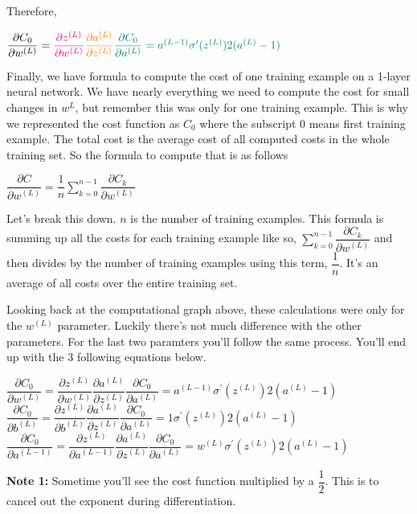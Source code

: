 \documentclass[11pt]{article}
\begin{document}
Therefore,

\(\dfrac{\partial C_0}{\partial w^{(L)}} = \color{magenta}{ \dfrac{\partial z^{(L)}}{\partial w^{(L)}} } \color{orange}{ \dfrac{\partial a^{(L)}}{\partial z^{(L)}} } \color{teal}{ \dfrac{\partial C_0}{\partial a^{(L)}} } = a^{(L-1)} \sigma^{\prime}(z^{(L)}) 2(a^{(L)} - 1)\)

Finally, we have formula to compute the cost of one training example on
a 1-layer neural network. We have nearly everything we need to compute
the cost for small changes in \(w^{L}\), but remember this was only for
one training example. This is why we represented the cost function as
\(C_0\) where the subscript 0 means first training example. The total
cost is the average cost of all computed costs in the whole training
set. So the formula to compute that is as follows

\(\dfrac{\partial C}{\partial w^{(L)}} = \dfrac{1}{n} \sum\limits_{k=0}^{n-1} \dfrac{\partial C_k}{\partial w^{(L)}}\)

Let's break this down. \(n\) is the number of training examples. This
formula is summing up all the costs for each training example like so,
\(\sum\limits_{k=0}^{n-1} \dfrac{\partial C_k}{\partial w^{(L)}}\) and
then divides by the number of training examples using this term,
\(\dfrac{1}{n}\). It's an average of all costs over the entire training
set.

Looking back at the computational graph above, these calculations were
only for the \(w^{(L)}\) parameter. Luckily there's not much difference
with the other parameters. For the last two paramters you'll follow the
same process. You'll end up with the 3 following equations below.

\(\dfrac{\partial C_0}{\partial w^{(L)}} = \dfrac{\partial z^{(L)}}{\partial w^{(L)}} \dfrac{\partial a^{(L)}}{\partial z^{(L)}} \dfrac{\partial C_0}{\partial a^{(L)}} = a^{(L-1)} \sigma^{\prime}(z^{(L)}) 2(a^{(L)} - 1)\)\\
\(\dfrac{\partial C_0}{\partial b^{(L)}} = \dfrac{\partial z^{(L)}}{\partial b^{(L)}} \dfrac{\partial a^{(L)}}{\partial z^{(L)}} \dfrac{\partial C_0}{\partial a^{(L)}} = 1 \sigma^{\prime}(z^{(L)}) 2(a^{(L)} - 1)\)\\
\(\dfrac{\partial C_0}{\partial a^{(L-1)}} = \dfrac{\partial z^{(L)}}{\partial a^{(L-1)}} \dfrac{\partial a^{(L)}}{\partial z^{(L)}} \dfrac{\partial C_0}{\partial a^{(L)}} = w^{(L)} \sigma^{\prime}(z^{(L)}) 2(a^{(L)} - 1)\)

\textbf{Note 1:} Sometime you'll see the cost function multiplied by a
\(\dfrac{1}{2}\). This is to cancel out the exponent during
differentiation.
\end{document}
